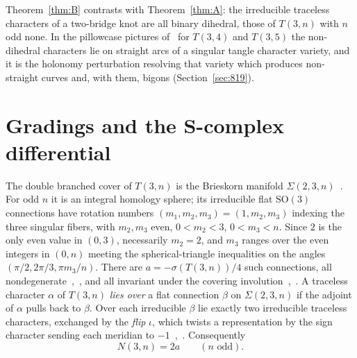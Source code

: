 \documentclass[11pt,reqno]{amsart}
\theoremstyle{plain}
\theoremstyle{definition}
\newcommand{\SO}{\mathrm{SO}(3)}
\newcommand{\Sig}{\Sigma}
\begin{document}
Theorem~\ref{thm:B} contrasts with Theorem~\ref{thm:A}: the irreducible traceless characters of a
two-bridge knot are all binary dihedral, those of $T(3,n)$ with $n$ odd none. In the pillowcase pictures
of~\cite[\S\S11.6--11.7]{HHK2} for $T(3,4)$ and $T(3,5)$ the non-dihedral characters lie on straight arcs
of a singular tangle character variety, and it is the holonomy perturbation resolving that variety which
produces non-straight curves and, with them, bigons (Section~\ref{sec:819}).

\section{Gradings and the S-complex differential}\label{sec:grading}

The double branched cover of $T(3,n)$ is the Brieskorn manifold $\Sig(2,3,n)$~\cite[\S7.4]{PS}. For odd $n$
it is an integral homology sphere; its irreducible flat $\SO$ connections have rotation numbers
$(m_1,m_2,m_3)=(1,m_2,m_3)$ indexing the three singular fibers, with $m_2,m_3$ even, $0<m_2<3$,
$0<m_3<n$. Since $2$ is the only even value in $(0,3)$, necessarily $m_2=2$, and $m_3$ ranges over the
even integers in $(0,n)$ meeting the spherical-triangle inequalities on the angles
$(\pi/2,2\pi/3,\pi m_3/n)$. There are $a=-\sigma(T(3,n))/4$ such connections, all
nondegenerate~\cite{FS},~\cite[\S7.4]{PS}, and all invariant under the covering
involution~\cite[\S7.4]{PS},~\cite[\S9.5]{DSEquiv}. A traceless character $\alpha$ of $T(3,n)$ \emph{lies
over} a flat connection $\beta$ on $\Sig(2,3,n)$ if the adjoint of $\alpha$ pulls back to $\beta$. Over each
irreducible $\beta$ lie exactly two irreducible traceless characters, exchanged by the \emph{flip} $\iota$,
which twists a representation by the sign character sending each meridian to
$-1$~\cite[Prop.~4.1(c)]{PS},~\cite[\S\S2.3, 9.1]{DSEquiv}. Consequently
\begin{equation}\label{eq:N2a}
N(3,n)=2a\qquad(n\text{ odd}).
\end{equation}
\end{document}
